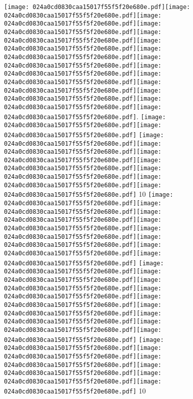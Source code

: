 \documentclass{article}
\newcommand{\origpg}[2]{\texttt{[image: 024a0cd0830caa15017f55f5f20e680e.pdf]}}
\begin{document}
{\vspace{0.385pt}\origpg{13}{85.303pt 606.03pt 92.921pt 622.17pt}\origpg{13}{93pt 606.03pt 99.377pt 622.17pt}\hspace{-0.113pt}\origpg{13}{99.264pt 606.03pt 106.43pt 622.17pt}\origpg{13}{106.48pt 606.03pt 115.11pt 622.17pt}\origpg{13}{115.11pt 606.03pt 125.33pt 622.17pt}\origpg{13}{125.27pt 606.03pt 133.34pt 622.17pt}\hspace{-0.597pt}\origpg{13}{132.74pt 606.03pt 140.95pt 622.17pt}\origpg{13}{140.95pt 606.03pt 148.12pt 622.17pt}\hspace{-0.21pt}\origpg{13}{147.91pt 606.03pt 156.55pt 622.17pt}\origpg{13}{156.55pt 606.03pt 163.71pt 622.17pt}\origpg{13}{163.79pt 606.03pt 170.85pt 622.17pt}\origpg{13}{170.78pt 606.03pt 178.4pt 622.17pt}\origpg{13}{178.48pt 606.03pt 187.12pt 622.17pt}\hspace{-0.21pt}\origpg{13}{186.91pt 606.03pt 194.33pt 622.17pt}. \origpg{13}{208.21pt 606.03pt 219.86pt 622.17pt}\origpg{13}{219.76pt 606.03pt 226.93pt 622.17pt} \origpg{13}{236.37pt 606.03pt 244.44pt 622.17pt}\hspace{-0.113pt}\origpg{13}{244.33pt 606.03pt 252.96pt 622.17pt}\origpg{13}{252.96pt 606.03pt 260.13pt 622.17pt}\hspace{-0.145pt}\origpg{13}{259.99pt 606.03pt 268.06pt 622.17pt}\hspace{-0.355pt}\origpg{13}{267.7pt 606.03pt 276.34pt 622.17pt}\origpg{13}{276.34pt 606.03pt 284.18pt 622.17pt}\hspace{-0.339pt}\origpg{13}{283.84pt 606.03pt 291.01pt 622.17pt} 10 \origpg{13}{326.16pt 606.03pt 334.8pt 622.17pt}\origpg{13}{334.8pt 606.03pt 342.87pt 622.17pt}\origpg{13}{342.79pt 606.03pt 350.63pt 622.17pt}\hspace{-0.129pt}\origpg{13}{350.5pt 606.03pt 357.67pt 622.17pt}\origpg{13}{357.72pt 606.03pt 364.09pt 622.17pt}\hspace{-0.113pt}\origpg{13}{363.98pt 606.03pt 371.14pt 622.17pt}\origpg{13}{371.19pt 606.03pt 379.83pt 622.17pt}\hspace{-0.21pt}\origpg{13}{379.62pt 606.03pt 386.78pt 622.17pt} \origpg{13}{396.45pt 606.03pt 403.62pt 622.17pt}\hspace{-0.178pt}\origpg{13}{403.44pt 606.03pt 412.08pt 622.17pt}\origpg{13}{412.08pt 606.03pt 422.29pt 622.17pt}\origpg{13}{422.23pt 606.03pt 430.3pt 622.17pt}\hspace{-1.081pt}\origpg{13}{429.22pt 606.03pt 437.27pt 622.17pt}\origpg{13}{437.17pt 606.03pt 444.6pt 622.17pt}\origpg{13}{444.6pt 606.03pt 453.23pt 622.17pt}\origpg{13}{453.3pt 606.03pt 461.93pt 622.17pt}\origpg{13}{461.93pt 606.03pt 469.36pt 622.17pt} \origpg{13}{479.04pt 606.03pt 487.68pt 622.17pt}\origpg{13}{487.68pt 606.03pt 494.84pt 622.17pt}\hspace{-0.145pt}\origpg{13}{494.7pt 606.03pt 502.77pt 622.17pt}\origpg{13}{502.87pt 606.03pt 510.48pt 622.17pt}\hspace{-0.145pt}\origpg{13}{510.34pt 606.03pt 521.18pt 622.17pt}\origpg{13}{521.18pt 606.03pt 529.25pt 622.17pt} 10 

}
\end{document}
